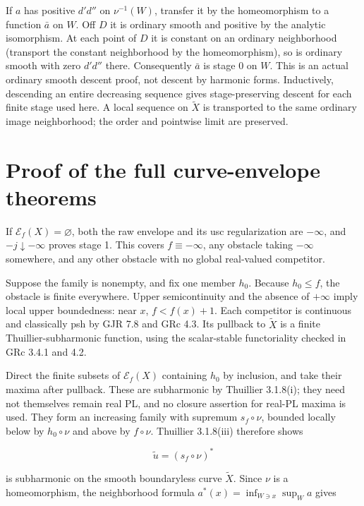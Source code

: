 \documentclass[
  11pt,
]{article}
\begin{document}
If \(a\) has positive \(d'd''\) on \(\nu^{-1}(W)\), transfer it by the
homeomorphism to a function \(\bar a\) on \(W\). Off \(D\) it is
ordinary smooth and positive by the analytic isomorphism. At each point
of \(D\) it is constant on an ordinary neighborhood (transport the
constant neighborhood by the homeomorphism), so is ordinary smooth with
zero \(d'd''\) there. Consequently \(\bar a\) is stage 0 on \(W\). This
is an actual ordinary smooth descent proof, not descent by harmonic
forms. Inductively, descending an entire decreasing sequence gives
stage-preserving descent for each finite stage used here. A local
sequence on \(\widetilde X\) is transported to the same ordinary image
neighborhood; the order and pointwise limit are preserved.

\section{Proof of the full curve-envelope
theorems}\label{proof-of-the-full-curve-envelope-theorems}

If \(\mathcal E_f(X)=\varnothing\), both the raw envelope and its usc
regularization are \(-\infty\), and \(-j\downarrow-\infty\) proves stage
1. This covers \(f\equiv-\infty\), any obstacle taking \(-\infty\)
somewhere, and any other obstacle with no global real-valued competitor.

Suppose the family is nonempty, and fix one member \(h_0\). Because
\(h_0\leq f\), the obstacle is finite everywhere. Upper semicontinuity
and the absence of \(+\infty\) imply local upper boundedness: near
\(x\), \(f<f(x)+1\). Each competitor is continuous and classically psh
by GJR 7.8 and GRc 4.3. Its pullback to \(\widetilde X\) is a finite
Thuillier-subharmonic function, using the scalar-stable functoriality
checked in GRc 3.4.1 and 4.2.

Direct the finite subsets of \(\mathcal E_f(X)\) containing \(h_0\) by
inclusion, and take their maxima after pullback. These are subharmonic
by Thuillier 3.1.8(i); they need not themselves remain real PL, and no
closure assertion for real-PL maxima is used. They form an increasing
family with supremum \(s_f\circ\nu\), bounded locally below by
\(h_0\circ\nu\) and above by \(f\circ\nu\). Thuillier 3.1.8(iii)
therefore shows

\[
\widetilde u=(s_f\circ\nu)^*
\]

is subharmonic on the smooth boundaryless curve \(\widetilde X\). Since
\(\nu\) is a homeomorphism, the neighborhood formula
\(a^*(x)=\inf_{W\ni x}\sup_W a\) gives
\end{document}
